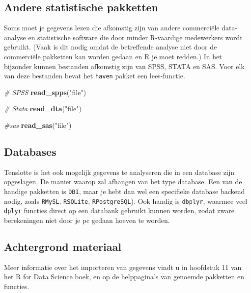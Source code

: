 \documentclass[]{tufte-book}
\newenvironment{Shaded}{}{}
\newcommand{\CommentTok}[1]{\textcolor[rgb]{0.38,0.63,0.69}{\textit{#1}}}
\newcommand{\KeywordTok}[1]{\textcolor[rgb]{0.00,0.44,0.13}{\textbf{#1}}}
\newcommand{\NormalTok}[1]{#1}
\newcommand{\StringTok}[1]{\textcolor[rgb]{0.25,0.44,0.63}{#1}}
\begin{document}
\hypertarget{andere-statistische-pakketten}{%
\subsection{Andere statistische pakketten}\label{andere-statistische-pakketten}}

Soms moet je gegevens lezen die afkomstig zijn van andere commerciële data-analyse en statistische software die door minder R-vaardige medewerkers wordt gebruikt. (Vaak is dit nodig omdat de betreffende analyse niet door de commerciële pakketten kan worden gedaan en R je moet redden.) In het bijzonder kunnen bestanden afkomstig zijn van SPSS, STATA en SAS. Voor elk van deze bestanden bevat het \texttt{haven} pakket een lees-functie.

\begin{Shaded}
\begin{Highlighting}[]
\CommentTok{# SPSS}
\KeywordTok{read_spps}\NormalTok{(}\StringTok{"file"}\NormalTok{)}

\CommentTok{# Stata }
\KeywordTok{read_dta}\NormalTok{(}\StringTok{"file"}\NormalTok{)}

\CommentTok{#sas}
\KeywordTok{read_sas}\NormalTok{(}\StringTok{"file"}\NormalTok{)}
\end{Highlighting}
\end{Shaded}

\hypertarget{databases}{%
\subsection{Databases}\label{databases}}

Tenslotte is het ook mogelijk gegevens te analyseren die in een database zijn opgeslagen. De manier waarop zal afhangen van het type database. Een van de handige pakketten is \texttt{DBI}, maar je hebt dan wel een specifieke database backend nodig, zoals \texttt{RMySL}, \texttt{RSQLite}, \texttt{RPostgreSQL}). Ook handig is \texttt{dbplyr}, waarmee veel \texttt{dplyr} functies direct op een databank gebruikt kunnen worden, zodat zware berekeningen niet door je pc gedaan hoeven te worden.

\hypertarget{achtergrond-materiaal}{%
\subsection{Achtergrond materiaal}\label{achtergrond-materiaal}}

Meer informatie over het importeren van gegevens vindt u in hoofdstuk 11 van het \href{https://r4ds.had.co.nz/data-import.html}{R for Data Science boek}, en op de helppagina's van genoemde pakketten en functies.
\end{document}
